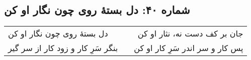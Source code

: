 \begin{center}
\section*{شماره ۴۰: دل بستۀ روی چون نگار او کن}
\label{sec:040}
\begin{longtable}{l p{0.5cm} r}
دل بستهٔ روی چون نگار او کن
&&
جان بر کف دست نه، نثار او کن
\\
بنگر سَرِ کار و زود کار از سر گیر
&&
پس کار و سر اندر سَرِ کار او کن
\\
\end{longtable}
\end{center}
